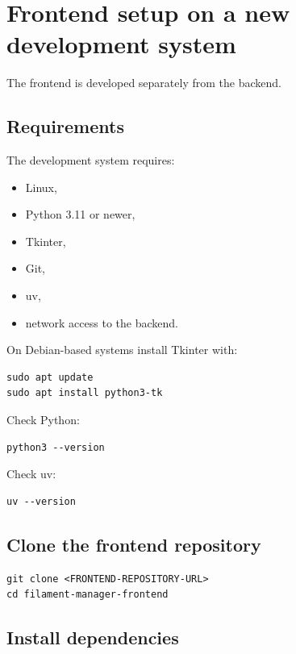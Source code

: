 \documentclass[a4paper,11pt]{article}
\begin{document}
\section{Frontend setup on a new development system}

The frontend is developed separately from the backend.

\subsection{Requirements}

The development system requires:

\begin{itemize}
  \item Linux,
  \item Python 3.11 or newer,
  \item Tkinter,
  \item Git,
  \item uv,
  \item network access to the backend.
\end{itemize}

On Debian-based systems install Tkinter with:

\begin{lstlisting}
sudo apt update
sudo apt install python3-tk
\end{lstlisting}

Check Python:

\begin{lstlisting}
python3 --version
\end{lstlisting}

Check uv:

\begin{lstlisting}
uv --version
\end{lstlisting}

\subsection{Clone the frontend repository}

\begin{lstlisting}
git clone <FRONTEND-REPOSITORY-URL>
cd filament-manager-frontend
\end{lstlisting}

\subsection{Install dependencies}
\end{document}
